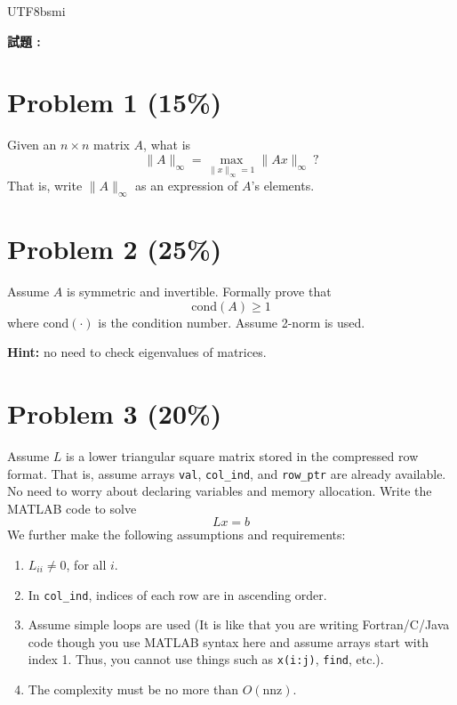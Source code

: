\documentclass[12pt,a4paper]{article}
\begin{document}
\begin{CJK*}{UTF8}{bsmi}

\noindent \textbf{試題 :}

\vspace{0.5cm}

\section*{Problem 1 (15\%)}
Given an $n \times n$ matrix $A$, what is
\[
\|A\|_\infty = \max_{\|x\|_\infty = 1} \|Ax\|_\infty \ ?
\]
That is, write $\|A\|_\infty$ as an expression of $A$'s elements.

\vspace{0.5cm}

\section*{Problem 2 (25\%)}
Assume $A$ is symmetric and invertible. Formally prove that
\[
\text{cond}(A) \ge 1
\]
where $\text{cond}(\cdot)$ is the condition number. Assume 2-norm is used.

\vspace{0.25cm}
\noindent \textbf{Hint:} no need to check eigenvalues of matrices.

\vspace{0.5cm}

\section*{Problem 3 (20\%)}
Assume $L$ is a lower triangular square matrix stored in the compressed row format. That is, assume arrays \texttt{val}, \texttt{col\_ind}, and \texttt{row\_ptr} are already available. No need to worry about declaring variables and memory allocation. Write the MATLAB code to solve
\[
Lx = b
\]
We further make the following assumptions and requirements:
\begin{enumerate}[(1)]
    \item $L_{ii} \ne 0$, for all $i$.
    \item In \texttt{col\_ind}, indices of each row are in ascending order.
    \item Assume simple loops are used (It is like that you are writing Fortran/C/Java code though you use MATLAB syntax here and assume arrays start with index 1. Thus, you cannot use things such as \texttt{x(i:j)}, \texttt{find}, etc.).
    \item The complexity must be no more than $O(\text{nnz})$.
\end{enumerate}


\end{CJK*}
\end{document}
